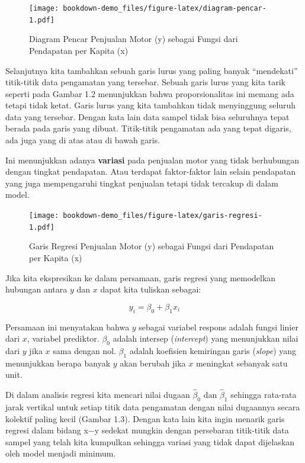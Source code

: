 \documentclass[
]{book}
\begin{document}
\begin{figure}
\centering
\texttt{[image: bookdown-demo\_files/figure-latex/diagram-pencar-1.pdf]}
\caption{\label{fig:diagram-pencar}Diagram Pencar Penjualan Motor (y) sebagai Fungsi dari Pendapatan per Kapita (x)}
\end{figure}

Selanjutnya kita tambahkan sebuah garis lurus yang paling banyak ``mendekati'' titik-titik data pengamatan yang tersebar. Sebuah garis lurus yang kita tarik seperti pada Gambar 1.2 menunjukkan bahwa proporsionalitas ini memang ada tetapi tidak ketat. Garis lurus yang kita tambahkan tidak menyinggung seluruh data yang tersebar. Dengan kata lain data sampel tidak bisa seluruhnya tepat berada pada garis yang dibuat. Titik-titik pengamatan ada yang tepat digaris, ada juga yang di atas atau di bawah garis.

Ini menunjukkan adanya \textbf{variasi} pada penjualan motor yang tidak berhubungan dengan tingkat pendapatan. Atau terdapat faktor-faktor lain selain pendapatan yang juga mempengaruhi tingkat penjualan tetapi tidak tercakup di dalam model.

\begin{figure}
\centering
\texttt{[image: bookdown-demo\_files/figure-latex/garis-regresi-1.pdf]}
\caption{\label{fig:garis-regresi}Garis Regresi Penjualan Motor (y) sebagai Fungsi dari Pendapatan per Kapita (x)}
\end{figure}

Jika kita ekspresikan ke dalam persamaan, garis regresi yang memodelkan hubungan antara \(y\) dan \(x\) dapat kita tuliskan sebagai:

\begin{equation} 
y_i=\beta_0 + \beta_1x_i
\label{eq:persamaan-noerror}
\end{equation}

Persamaan ini menyatakan bahwa \(y\) sebagai variabel respons adalah fungsi linier dari \(x\), variabel prediktor. \(\beta_0\) adalah intersep (\emph{intercept}) yang menunjukkan nilai dari \(y\) jika \(x\) sama dengan nol. \(\beta_1\) adalah koefisien kemiringan garis (\emph{slope}) yang menunjukkan berapa banyak \(y\) akan berubah jika \(x\) meningkat sebanyak satu unit.

Di dalam analisis regresi kita mencari nilai dugaan \(\hat \beta_0\) dan \(\hat \beta_1\) sehingga rata-rata jarak vertikal untuk setiap titik data pengamatan dengan nilai dugaannya secara kolektif paling
kecil (Gambar 1.3). Dengan kata lain kita ingin menarik garis regresi dalam bidang x−y sedekat mungkin dengan persebaran titik-titik data sampel yang telah
kita kumpulkan sehingga variasi yang tidak dapat dijelaskan oleh model menjadi minimum.
\end{document}
